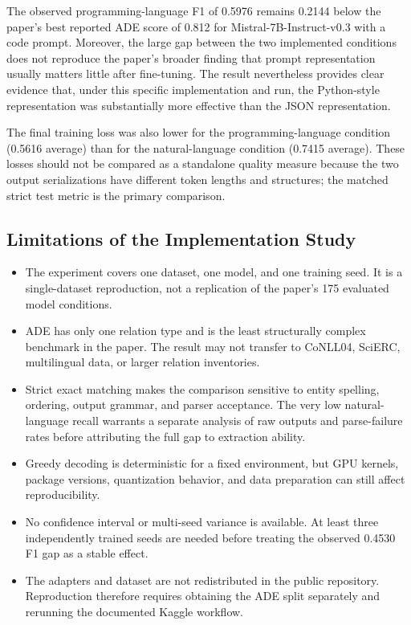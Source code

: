 \documentclass[11pt]{article}
\begin{document}
The observed programming-language F1 of 0.5976 remains 0.2144 below the
paper's best reported ADE score of 0.812 for
Mistral-7B-Instruct-v0.3 with a code prompt. Moreover, the large gap
between the two implemented conditions does not reproduce the paper's
broader finding that prompt representation usually matters little after
fine-tuning. The result nevertheless provides clear evidence that, under
this specific implementation and run, the Python-style representation
was substantially more effective than the JSON representation.

The final training loss was also lower for the programming-language
condition (0.5616 average) than for the natural-language condition
(0.7415 average). These losses should not be compared as a standalone
quality measure because the two output serializations have different
token lengths and structures; the matched strict test metric is the
primary comparison.

\subsection{Limitations of the Implementation Study}
\label{limitations-of-the-implementation-study}

\begin{itemize}
\item
  The experiment covers one dataset, one model, and one training seed.
  It is a single-dataset reproduction, not a replication of the paper's
  175 evaluated model conditions.
\item
  ADE has only one relation type and is the least structurally complex
  benchmark in the paper. The result may not transfer to CoNLL04,
  SciERC, multilingual data, or larger relation inventories.
\item
  Strict exact matching makes the comparison sensitive to entity
  spelling, ordering, output grammar, and parser acceptance. The very
  low natural-language recall warrants a separate analysis of raw outputs
  and parse-failure rates before attributing the full gap to extraction
  ability.
\item
  Greedy decoding is deterministic for a fixed environment, but GPU
  kernels, package versions, quantization behavior, and data preparation
  can still affect reproducibility.
\item
  No confidence interval or multi-seed variance is available. At least
  three independently trained seeds are needed before treating the
  observed 0.4530 F1 gap as a stable effect.
\item
  The adapters and dataset are not redistributed in the public
  repository. Reproduction therefore requires obtaining the ADE split
  separately and rerunning the documented Kaggle workflow.
\end{itemize}
\end{document}
